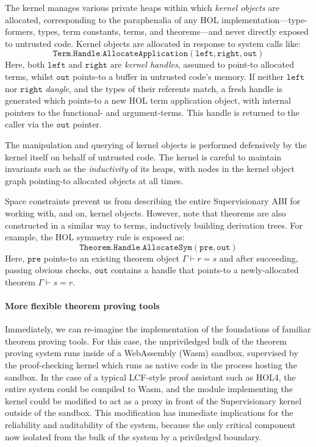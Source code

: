 \documentclass[sigplan, review]{acmart}
\begin{document}

The kernel manages various private heaps within which \emph{kernel objects} are allocated, corresponding to the paraphenalia of any HOL implementation---type-formers, types, term constants, terms, and theorems---and never directly exposed to untrusted code.
Kernel objects are allocated in response to system calls like:
\begin{displaymath}
\mathtt{Term.Handle.AllocateApplication(left, right, out)}
\end{displaymath}
Here, both $\mathtt{left}$ and $\mathtt{right}$ are \emph{kernel handles}, assumed to point-to allocated terms, whilst $\mathtt{out}$ points-to a buffer in untrusted code's memory.
If neither $\mathtt{left}$ nor $\mathtt{right}$ \emph{dangle}, and the types of their referents match, a fresh handle is generated which points-to a new HOL term application object, with internal pointers to the functional- and argument-terms.
This handle is returned to the caller via the $\mathtt{out}$ pointer.

The manipulation and querying of kernel objects is performed defensively by the kernel itself on behalf of untrusted code.
The kernel is careful to maintain invariants such as the \emph{inductivity} of its heaps, with nodes in the kernel object graph pointing-to allocated objects at all times.

Space constraints prevent us from describing the entire Supervisionary ABI for working with, and on, kernel objects.
However, note that theorems are also constructed in a similar way to terms, inductively building derivation trees.
For example, the HOL symmetry rule is exposed as:
\begin{displaymath}
\mathtt{Theorem.Handle.AllocateSym(pre, out)}
\end{displaymath}
Here, $\mathtt{pre}$ points-to an existing theorem object $\Gamma \vdash r = s$ and after succeeding, passing obvious checks, $\mathtt{out}$ contains a handle that points-to a newly-allocated theorem $\Gamma \vdash s = r$.

\paragraph{More flexible theorem proving tools}

Immediately, we can re-imagine the implementation of the foundations of familiar theorem proving tools.
For this case, the unpriviledged bulk of the theorem proving system runs inside of a WebAssembly (Wasm) sandbox, supervised by the proof-checking kernel which runs as native code in the process hosting the sandbox.
In the case of a typical LCF-style proof assistant such as HOL4, the entire system could be compiled to Wasm, and the module implementing the kernel could be modified to act as a proxy in front of the Supervisionary kernel outside of the sandbox.
This modification has immediate implications for the reliability and auditability of the system, because the only critical component now isolated from the bulk of the system by a priviledged boundary.
\end{document}
